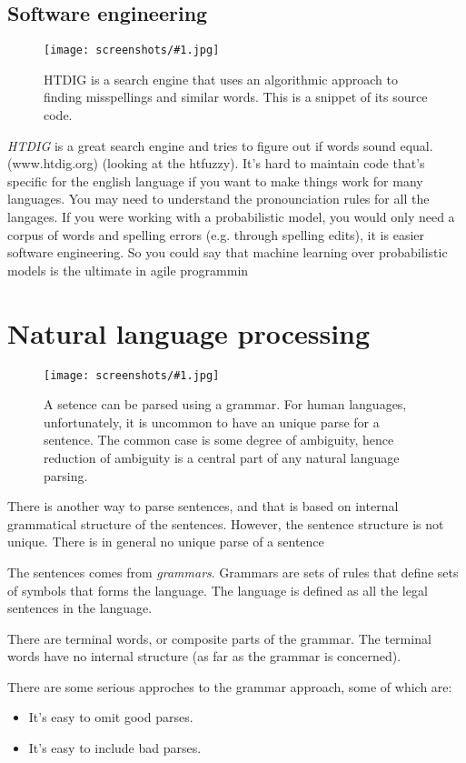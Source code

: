 \documentclass[a4, 12pt, english, USenglish]{scrreprt}
\newcommand{\screenshot}[2]{
\begin{figure}[htb]
\texttt{[image: screenshots/\#1.jpg]}
\label{#1}
\caption{#2}
\end{figure}}
\newcommand{\idx}[1]{{\em #1}\index{#1}}
\begin{document}
\section{Software engineering}

\screenshot{htdig}{HTDIG is a search engine that uses an algorithmic
  approach to finding misspellings and similar words.  This is a
  snippet of its source code.}

\idx{HTDIG} is a great search engine and tries to figure out if words
sound equal. (www.htdig.org) (looking at the htfuzzy).  It's hard to
maintain code that's specific for the english language if you want to
make things work for many languages.  You may need to understand the
pronounciation rules for all the langages.  If you were working with a
probabilistic model, you would only need a corpus of words and
spelling errors (e.g. through spelling edits), it is easier software
engineering.  So you could say that machine learning over
probabilistic models is the ultimate in agile programmin

\chapter{Natural language processing}

\screenshot{sentencestructure}{A setence can be parsed using a
  grammar. For human languages, unfortunately, it is uncommon to have
  an unique parse for a sentence.  The common case is some degree of
  ambiguity, hence reduction of ambiguity is a central part of any
  natural language parsing.}

There is another way to parse sentences, and that is based on internal
grammatical structure of the sentences.  However, the sentence
structure is not unique.  There is in general no unique parse of a sentence


The sentences comes from \idx{grammars}.  Grammars are sets of rules
that define sets of symbols that forms the language.  The language is
defined as all the legal sentences in the language.

There are terminal words, or composite parts of the grammar.  The
terminal words have no internal structure (as far as the grammar is
concerned).

There are some serious approches to the grammar approach, some  of
which are:

\begin{itemize}
\item   It's easy to omit good parses.
\item  It's easy to include bad parses.
\end{itemize}
\end{document}
